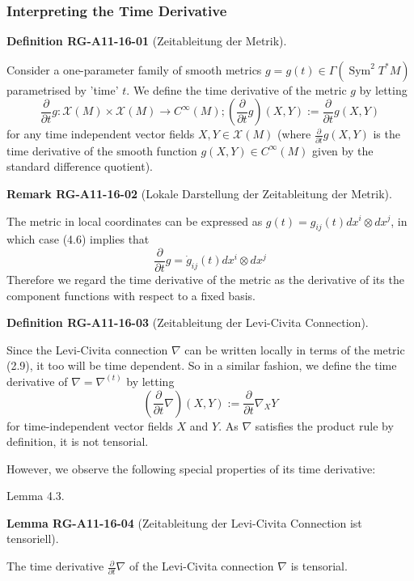 \documentclass[10pt, letterpaper]{article}
\newcommand{\CustomHeading}[3]{%
  \par\medskip\noindent%
  \textbf{#1 #2} \textnormal{(#3)}.\enskip%
}
\newenvironment{DEF}[2]{\begin{unitbox}\CustomHeading{Definition}{#1}{#2}}{\end{unitbox}}
\newenvironment{LEM}[2]{\begin{unitbox}\CustomHeading{Lemma}{#1}{#2}}{\end{unitbox}}
\newenvironment{REM}[2]{\begin{unitbox}\CustomHeading{Remark}{#1}{#2}}{\end{unitbox}}
\begin{document}
\subsubsection*{Interpreting the Time Derivative}


\begin{DEF}{RG-A11-16-01}{Zeitableitung der Metrik}
Consider a one-parameter family of smooth metrics $g=g(t) \in \Gamma\left(\operatorname{Sym}^{2} T^{*} M\right)$ parametrised by 'time' $t$. We define the time derivative of the metric $g$ by letting
$$
\frac{\partial}{\partial t} g: \mathscr{X}(M) \times \mathscr{X}(M) \rightarrow C^{\infty}(M); \left(\frac{\partial}{\partial t} g\right)(X, Y):=\frac{\partial}{\partial t} g(X, Y)
$$
for any time independent vector fields $X, Y \in \mathscr{X}(M)$ (where $\frac{\partial}{\partial t} g(X, Y)$ is the time derivative of the smooth function $g(X, Y) \in C^{\infty}(M)$ given by the standard difference quotient).
\end{DEF}

\begin{REM}{RG-A11-16-02}{Lokale Darstellung der Zeitableitung der Metrik}
The metric in local coordinates can be expressed as $g(t)=g_{i j}(t) d x^{i} \otimes d x^{j}$, in which case (4.6) implies that
$$
\frac{\partial}{\partial t} g=\dot{g}_{i j}(t) d x^{i} \otimes d x^{j}
$$
Therefore we regard the time derivative of the metric as the derivative of its the component functions with respect to a fixed basis.
\end{REM}


\begin{DEF}{RG-A11-16-03}{Zeitableitung der Levi-Civita Connection}
Since the Levi-Civita connection $\nabla$ can be written locally in terms of the metric (2.9), it too will be time dependent. So in a similar fashion, we define the time derivative of $\nabla=\nabla^{(t)}$ by letting
$$
\left(\frac{\partial}{\partial t} \nabla\right)(X, Y):=\frac{\partial}{\partial t} \nabla_{X} Y
$$
for time-independent vector fields $X$ and $Y$. As $\nabla$ satisfies the product rule by definition, it is not tensorial.
\end{DEF}


However, we observe the following special properties of its time derivative:

Lemma 4.3. 

\begin{LEM}{RG-A11-16-04}{Zeitableitung der Levi-Civita Connection ist tensoriell}
The time derivative $\frac{\partial}{\partial t} \nabla$ of the Levi-Civita connection $\nabla$ is tensorial.
\end{LEM}
\end{document}
